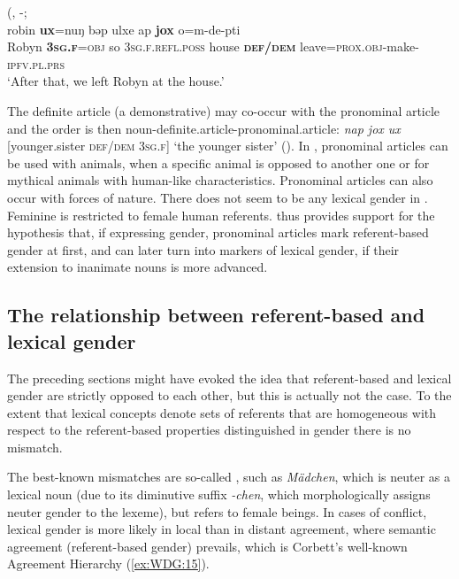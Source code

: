 \documentclass[output=collectionpaper]{langsci/langscibook}
\begin{document}
\ea\label{ex:WDG:14}
 (, -; \citealt[180]{Loughnane2009}\\
\gll robin	\textbf{ux}=nuŋ	bəp	ulxe	ap	\textbf{jox} o=m-de-pti\\
Robyn	\textbf{3\textsc{sg.f}}=\textsc{obj}	so	3\textsc{sg.f.refl.poss}	house	\textbf{\textsc{def/dem}} leave=\textsc{prox.obj}-make-\textsc{ipfv.pl.prs}\\
\glt `After that, we left Robyn at the house.'\\
\z

The  definite article (a demonstrative) may co-occur with the pronominal article and the order is then noun-definite.article-pronominal.article: \textit{nap jox ux} [younger.sister \textsc{def/dem 3sg.f}] `the younger sister' (\citealt[128]{Loughnane2009}). In , pronominal articles can be used with animals, when a specific animal is opposed to another one or for mythical animals with human-like characteristics. Pronominal articles can also occur with forces of nature. There does not seem to be any lexical gender in . Feminine is restricted to female human referents.  thus provides support for the hypothesis that, if expressing gender, pronominal articles mark referent-based gender at first, and can later turn into markers of lexical gender, if their extension to inanimate nouns is more advanced.


  \subsection{The relationship between referent-based and lexical gender}
\label{sec:WDG:3.6}

The preceding sections might have evoked the idea that referent-based and lexical gender are strictly opposed to each other, but this is actually not the case. To the extent that lexical concepts denote sets of referents that are homogeneous with respect to the referent-based properties distinguished in gender there is no mismatch.

The best-known mismatches are so-called , such as  \textit{Mädchen}, which is neuter as a lexical noun (due to its diminutive suffix \textit{-chen}, which morphologically assigns neuter gender to the lexeme), but refers to female beings. In cases of conflict, lexical gender is more likely in local than in distant agreement, where semantic agreement (referent-based gender) prevails, which is Corbett's well-known Agreement Hierarchy (\ref{ex:WDG:15}).
\end{document}
